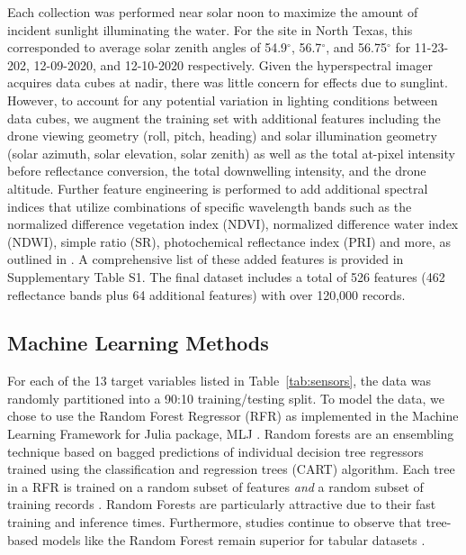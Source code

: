 \documentclass[remotesensing,article,submit,pdftex,moreauthors]{Definitions/mdpi}
\begin{document}
Each collection was performed near solar noon to maximize the amount of incident sunlight illuminating the water. For the site in North Texas, this corresponded to average solar zenith angles of 54.9$^{\circ}$, 56.7$^{\circ}$, and 56.75$^{\circ}$ for 11-23-202, 12-09-2020, and 12-10-2020 respectively. Given the hyperspectral imager acquires data cubes at nadir, there was little concern for effects due to sunglint. However, to account for any potential variation in lighting conditions between data cubes, we augment the training set with additional features including the drone viewing geometry (roll, pitch, heading) and solar illumination geometry (solar azimuth, solar elevation, solar zenith) as well as the total at-pixel intensity before reflectance conversion, the total downwelling intensity, and the drone altitude. Further feature engineering is performed to add additional spectral indices that utilize combinations of specific wavelength bands such as the normalized difference vegetation index (NDVI), normalized difference water index (NDWI), simple ratio (SR), photochemical reflectance index (PRI) and more, as outlined in \cite{envi_vegetation_indices, thenkabail2018hyperspectral,kaufman1992atmospherically, SpectralIndexWheat}. A comprehensive list of these added features is provided in Supplementary Table S1. The final dataset includes a total of 526 features (462 reflectance bands plus 64 additional features) with over 120,000 records. 

\subsection{Machine Learning Methods}

For each of the 13 target variables listed in Table~\ref{tab:sensors}, the data was randomly partitioned into a 90:10 training/testing split. To model the data, we chose to use the Random Forest Regressor (RFR) as implemented in the Machine Learning Framework for Julia package,  MLJ \cite{MLJ1}.  Random forests are an ensembling technique based on bagged predictions of individual decision tree regressors trained using the classification and regression trees (CART) algorithm. Each tree in a RFR is trained on a random subset of features \textit{and} a random subset of training records \cite{decision-trees, random-forest}. Random Forests are particularly attractive due to their fast training and inference times. Furthermore, studies continue to observe that tree-based models like the Random Forest remain superior for tabular datasets \cite{grinsztajn2022tree, shwartz2022tabular}.
\end{document}
